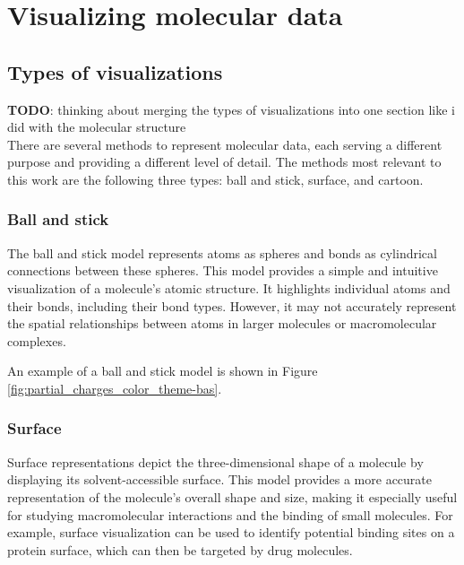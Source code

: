 \documentclass[
  digital,     %
  oneside,     %
  nosansbold,  %
  nocolorbold, %
  lof,         %
  lot,         %
]{fithesis4}
\begin{document}
\chapter{Visualizing molecular data}
\label{chapter:visualizing_molecular_data}

\section{Types of visualizations}
\label{section:types_of_visualizations}

\textbf{TODO}: thinking about merging the types of visualizations into one section like i did with the molecular structure \\

There are several methods to represent molecular data, each serving a different purpose and providing a different level of detail. The methods most relevant to this work are the following three types: ball and stick, surface, and cartoon.

\subsection{Ball and stick}
\label{subsection:ball_and_stick}

The ball and stick model represents atoms as spheres and bonds as cylindrical connections between these spheres. This model provides a simple and intuitive visualization of a molecule's atomic structure. It highlights individual atoms and their bonds, including their bond types. However, it may not accurately represent the spatial relationships between atoms in larger molecules or macromolecular complexes.

An example of a ball and stick model is shown in Figure \ref{fig:partial_charges_color_theme-bas}.

\subsection{Surface}
\label{subsection:surface}

Surface representations depict the three-dimensional shape of a molecule by displaying its solvent-accessible surface.
This model provides a more accurate representation of the molecule's overall shape and size, making it especially useful for studying macromolecular interactions and the binding of small molecules.
For example, surface visualization can be used to identify potential binding sites on a protein surface, which can then be targeted by drug molecules.
\end{document}
